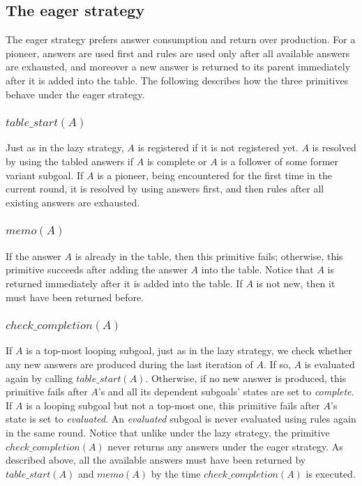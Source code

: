\documentclass{tlp}
\begin{document}
\subsection{\label{subsection:eager}The eager strategy}
The eager strategy prefers answer consumption and return over production. For a pioneer, answers are used first and rules are used only after all available answers are exhausted, and moreover a new answer is returned to its parent immediately after it is added into the table. The following describes how the three primitives behave under the eager strategy.

\subsubsection{$table\_start(A)$}
Just as in the lazy strategy, $A$ is registered if it is not registered yet. $A$ is resolved by using the tabled answers if $A$ is complete or $A$ is a follower of some former variant subgoal. If $A$ is a pioneer, being encountered for the first time in the current round, it is resolved by using answers first, and then rules after all existing answers are exhausted.

\subsubsection{$memo(A)$}
If the answer $A$ is already in the table, then this primitive fails; otherwise, this primitive succeeds after adding the answer $A$ into the table. Notice that $A$ is returned immediately after it is added into the table. If $A$ is not new, then it must have been returned before.

\subsubsection{$check\_completion(A)$}
If $A$ is a top-most looping subgoal, just as in the lazy strategy, we check whether any new answers are produced during the last iteration of $A$. If so, $A$ is evaluated again by calling $table\_start(A)$. Otherwise, if no new answer is produced, this primitive fails after $A$'s and all its dependent subgoals' states are set to {\it complete}. If $A$ is a looping subgoal but not a top-most one, this primitive fails after $A$'s state is set to {\it evaluated}. An {\it evaluated} subgoal is never evaluated using rules again in the same round. Notice that unlike under the lazy strategy, the primitive $check\_completion(A)$ never returns any answers under the eager strategy. As described above, all the available answers must have been returned by $table\_start(A)$ and $memo(A)$ by the time $check\_completion(A)$ is executed.
\end{document}
